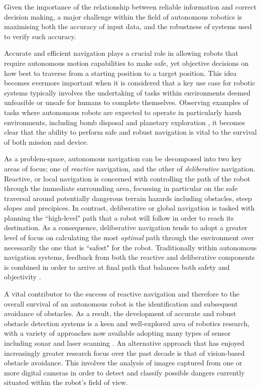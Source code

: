 Given the importance of the relationship between reliable information and correct decision making, a major challenge within the field of autonomous robotics is maximising both the accuracy of input data, and the robustness of systems used to verify such accuracy.

  Accurate and efficient navigation plays a crucial role in allowing robots that require autonomous motion capabilities to make safe, yet objective decisions on how best to traverse from a starting position to a target position. This idea becomes evermore important when it is considered that a key use case for robotic systems typically involves the undertaking of tasks within environments deemed unfeasible or unsafe for humans to complete themselves. Observing examples of tasks where autonomous robots are expected to operate in particularly harsh environments, including bomb disposal \cite{bomb-disposal} and planetary exploration \cite{planet-explore}, it becomes clear that the ability to perform safe and robust navigation is vital to the survival of both mission and device.

As a problem-space, autonomous navigation can be decomposed into two key areas of focus; one of \textit{reactive} navigation, and the other of \textit{deliberative} navigation. Reactive, or local navigation is concerned with controlling the path of the robot through the immediate surrounding area, focussing in particular on the safe traversal around potentially dangerous terrain hazards including obstacles, steep slopes and precipices. In contrast, deliberative or global navigation is tasked with planning the ``high-level" path that a robot will follow in order to reach its destination. As a consequence, deliberative navigation tends to adopt a greater level of focus on calculating the most \textit{optimal} path through the environment over necessarily the one that is ``safest" for the robot. Traditionally within autonomous navigation systems, feedback from both the reactive and deliberative components is combined in order to arrive at final path that balances both safety and objectivity \cite{mer-rover}. 

A vital contributor to the success of reactive navigation and therefore to the overall survival of an autonomous robot is the identification and subsequent avoidance of obstacles. As a result, the development of accurate and robust obstacle detection systems is a keen and well-explored area of robotics research, with a variety of approaches now available adopting many types of sensor including sonar \cite{sonar-sensor} and laser scanning \cite{laser-sensor}. An alternative approach that has enjoyed increasingly greater research focus over the past decade is that of vision-based obstacle avoidance. This involves the analysis of images captured from one or more digital cameras in order to detect and classify possible dangers currently situated within the robot's field of view. 


